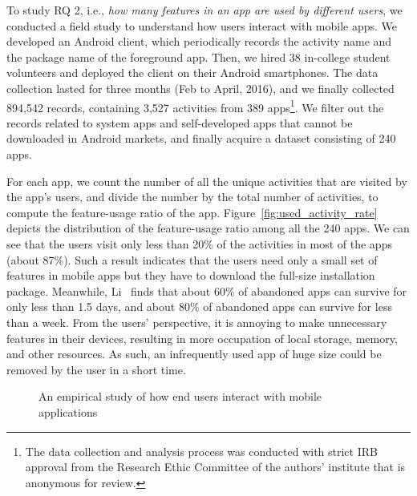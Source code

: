 To study RQ 2, i.e., \emph{how many features in an app are used by different users}, we conducted a field study to understand how users interact with mobile apps. We developed an Android client, which periodically records the activity name and the package name of the foreground app. Then, we hired 38 in-college student volunteers and deployed the client on their Android smartphones. The data collection lasted for three months (Feb to April, 2016), and we finally collected 894,542 records, containing 3,527 activities from 389 apps\footnote{The data collection and analysis process was conducted with strict IRB approval from the Research Ethic Committee of the authors' institute that is anonymous for review.}. We filter out the records related to system apps and self-developed apps that cannot be downloaded in Android markets, and finally acquire a dataset consisting of 240 apps.

For each app, we count the number of all the unique activities that are visited by the app's users, and divide the number by the total number of activities, to compute the feature-usage ratio of the app. Figure~\ref{fig:used_activity_rate} depicts the distribution of the feature-usage ratio among all the 240 apps. We can see that the users visit only less than 20\% of the activities in most of the apps (about 87\%). Such a result indicates that the users need only a small set of features in mobile apps but they have to download the full-size installation package. Meanwhile, Li~\cite{WWW2016Li} finds that about 60\% of abandoned apps can survive for only less than 1.5 days, and about 80\% of abandoned apps can survive for less than a week. From the users' perspective, it is annoying to make unnecessary features in their devices, resulting in more occupation of local storage, memory, and other resources. As such, an infrequently used app of huge size could be removed by the user in a short time.

\begin{figure}
   \centering
  \hspace{0in}
  \caption{An empirical study of how end users interact with mobile applications}
  \label{fig:empirical_study}
\end{figure}

